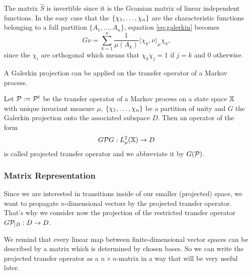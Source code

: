 The matrix $\hat{S}$ is invertible since it is the Gramian matrix of linear independent functions.
In the easy case that the $\{\chi_1,\dots,\chi_n\}$ are the characteristic functions belonging to a full partition $\{A_1,\dots,A_n\}$, equation \eqref{eq:galerkin} becomes 
\begin{equation*}
G\nu = \sum_{k=1}^n \frac{1}{\mu(A_k)} \langle \chi_k, \nu \rangle_\mu \chi_k,
\end{equation*}
since the $\chi_i$ are orthogonal which means that $\chi_k \chi_j = 1$ if $j=k$ and $0$ otherwise.

A Galerkin projection can be applied on the transfer operator of a Markov process.

\begin{defi}
Let $\mathcal{P} := \mathcal{P}^t$ be the transfer operator of a Markov process on a state space $\mathbb{X}$ with unique invariant measure $\mu$, $\{ \chi_1,\dots,\chi_n \}$ be a partition of unity and $G$ the Galerkin projection onto the associated subspace $D$. Then an operator of the form
\begin{equation*}
G \mathcal{P} G: L_\mu^2 (\mathbb{X}) \rightarrow D
\end{equation*}
is called projected transfer operator and we abbreviate it by $G(\mathcal{P})$.
\end{defi}

\subsubsection*{Matrix Representation} 

Since we are interested in transitions inside of our smaller (projected) space, we want to propagate $n$-dimensional vectors by the projected transfer operator. That's why we consider now the projection of the restricted transfer operator $G\mathcal{P}_{\mid D} : D \rightarrow D$. 

We remind that every linear map between finite-dimensional vector spaces can be described by a matrix which is determined by chosen bases.
So we can write the projected transfer operator as a $n \times n$-matrix in a way that will be very useful later.

